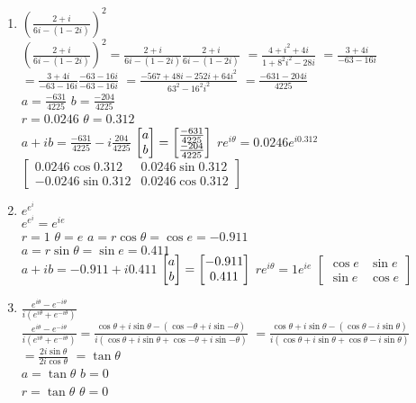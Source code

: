 \documentclass[11pt]{article}
\numberwithin{equation}{section}
\begin{document}
\begin{enumerate}
\begin{enumerate}
\item $\left(\frac{2+i}{6i-(1-2i)}\right)^2$\\[.5cm]
$\left(\frac{2+i}{6i-(1-2i)}\right)^2 = \frac{2+i}{6i-(1-2i)}\frac{2+i}{6i-(1-2i)}$
$=\frac{4 + i^2 + 4i}{1+8^2i^2-28i}$
$=\frac{3 + 4i}{-63 - 16i}$
$=\frac{3 + 4i}{-63 - 16i}\frac{-63 - 16i}{-63 - 16i}$
$=\frac{-567 + 48i - 252i +64i^2}{63^2 - 16^2i^2}$
$=\frac{-631 - 204i}{4225}$\\
$a = \frac{-631}{4225}$ $b = \frac{-204}{4225}$\\
$r = 0.0246$ $\theta = 0.312$\\
$a+ib = \frac{-631}{4225} - i\frac{204}{4225}$
$\left[\begin{array}{@{}c@{}} a\\ b\end{array}\right] = \left[\begin{array}{@{}c@{}} \frac{-631}{4225}\\\frac{-204}{4225}\end{array}\right]$
$re^{i\theta} = 0.0246e^{i0.312}$
$\left[\begin{array}{cc} 0.0246 \cos 0.312& 0.0246 \sin 0.312 \\ -0.0246 \sin 0.312 & 0.0246 \cos 0.312\end{array}\right]$

\item $e^{e^i}$\\[.5cm]
$e^{e^i} = e^{ie}$\\
$r = 1$ $\theta = e$
$a = r\cos{\theta} = \cos{e} = -0.911$\\
$a = r\sin{\theta} = \sin{e} = 0.411$\\
$a+ib = -0.911 + i0.411$
$\left[\begin{array}{@{}c@{}} a\\ b\end{array}\right] = \left[\begin{array}{@{}c@{}} -0.911\\0.411\end{array}\right]$
$re^{i\theta} = 1e^{ie}$
$\left[\begin{array}{cc} \cos e&  \sin e \\  \sin e & \cos e\end{array}\right]$

\item $\frac{e^{i\theta}-e^{-i\theta}}{i(e^{i\theta}+e^{-i\theta})}$\\[.5cm]
$\frac{e^{i\theta}-e^{-i\theta}}{i(e^{i\theta}+e^{-i\theta})} = \frac{\cos\theta + i\sin\theta - (\cos{-\theta} + i\sin{-\theta})}{i(\cos\theta + i\sin\theta + \cos{-\theta} + i\sin{-\theta})}$
$= \frac{\cos\theta + i\sin\theta - (\cos{\theta} - i\sin{\theta})}{i(\cos\theta + i\sin\theta + \cos{\theta} - i\sin{\theta})}$
$= \frac{ 2i\sin\theta}{2i\cos\theta}$
$= \tan\theta$\\
$a=\tan{\theta}$ $b = 0$\\
$r = \tan{\theta}$ $\theta = 0$\\



\end{enumerate}
\end{enumerate}
\end{document}
